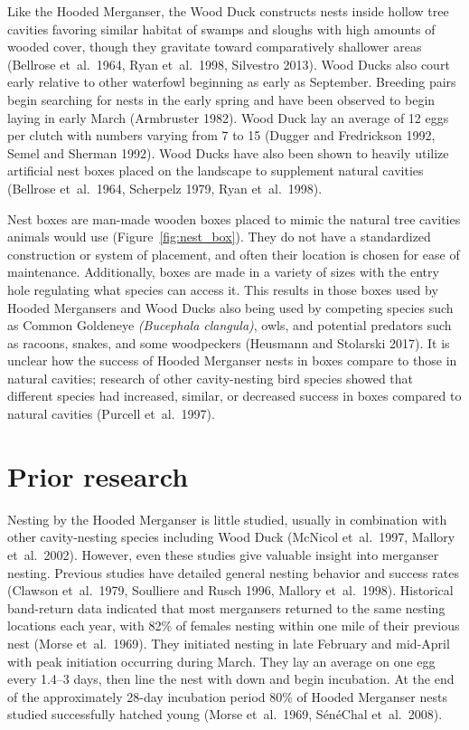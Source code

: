  

Like the Hooded Merganser, the Wood Duck constructs nests inside hollow tree cavities favoring similar habitat of swamps and sloughs with high amounts of wooded cover, though they gravitate toward comparatively shallower areas (Bellrose et~al.~1964, Ryan et~al.~1998, Silvestro 2013). Wood Ducks also court early relative to other waterfowl beginning as early as September. Breeding pairs begin searching for nests in the early spring and have been observed to begin laying in early March (Armbruster 1982). Wood Duck lay an average of 12 eggs per clutch with numbers varying from 7 to 15 (Dugger and Fredrickson 1992, Semel and Sherman 1992). Wood Ducks have also been shown to heavily utilize artificial nest boxes placed on the landscape to supplement natural cavities (Bellrose et~al.~1964, Scherpelz 1979, Ryan et~al.~1998).   

Nest boxes are man-made wooden boxes placed to mimic the natural tree cavities animals would use (Figure~\ref{fig:nest_box}). They do not have a standardized construction or system of placement, and often their location is chosen for ease of maintenance. Additionally, boxes are made in a variety of sizes with the entry hole regulating what species can access it. This results in those boxes used by Hooded Mergansers and Wood Ducks also being used by competing species such as Common Goldeneye \textit{(Bucephala clangula)}, owls, and potential predators such as racoons, snakes, and some woodpeckers (Heusmann and Stolarski 2017). It is unclear how the success of Hooded Merganser nests in boxes compare to those in natural cavities; research of other cavity-nesting bird species showed that different species had increased, similar, or decreased success in boxes compared to natural cavities (Purcell et~al.~1997).

 


\section*{Prior research}

Nesting by the Hooded Merganser is little studied, usually in combination with other cavity-nesting species including Wood Duck (McNicol et~al.~1997, Mallory et~al.~2002). However, even these studies give valuable insight into merganser nesting. Previous studies have detailed general nesting behavior and success rates (Clawson et~al.~1979, Soulliere and Rusch 1996, Mallory et~al.~1998). Historical band-return data indicated that most mergansers returned to the same nesting locations each year, with 82\% of females nesting within one mile of their previous nest (Morse et~al.~1969). They initiated nesting in late February and mid-April with peak initiation occurring during March. They lay an average on one egg every 1.4–3 days, then line the nest with down and begin incubation. At the end of the approximately 28-day incubation period 80\% of Hooded Merganser nests studied successfully hatched young (Morse et~al.~1969, SénéChal et~al.~2008).  

